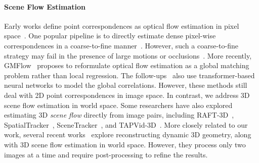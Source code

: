\paragraph{Scene Flow Estimation}
Early works define point correspondences as optical flow estimation in pixel space~\cite{horn1981determining,brox2004high,bruhn2005lucas,ilg2017flownet,teed2020raft}.
One popular pipeline is to directly estimate dense pixel-wise correspondences in a coarse-to-fine manner~\cite{dosovitskiy2015flownet,ilg2017flownet,sun2018pwc,teed2020raft}.
However, such a coarse-to-fine strategy may fail in the presence of large motions or occlusions~\cite{revaud2015epicflow}.
More recently,
GMFlow~\cite{Xu_2022_CVPR,xu2023unifying} proposes to reformulate optical flow estimation as a global matching problem rather than local regression.
The follow-ups~\cite{huang2022flowformer,shi2023flowformer++} also use transformer-based neural networks to model the global correlations.
However, these methods still deal with 2D point correspondences in image space.
In contrast,
we address 3D scene flow estimation in world space.
Some researchers have also explored estimating 3D \emph{scene flow} directly from image pairs,
including RAFT-3D~\cite{teed2021raft}, SpatialTracker~\cite{SpatialTracker}, SceneTracker~\cite{wang2025scenetracker}, and TAPVid-3D~\cite{koppula2024tapvid}.
More closely related to our work,
several recent works~\cite{sucar2025dynamic,st4rtrack2025,jin2024stereo4d} explore reconstructing dynamic 3D geometry,
along with 3D scene flow estimation in world space.
However, they process only two images at a time and require post-processing to refine the results.

